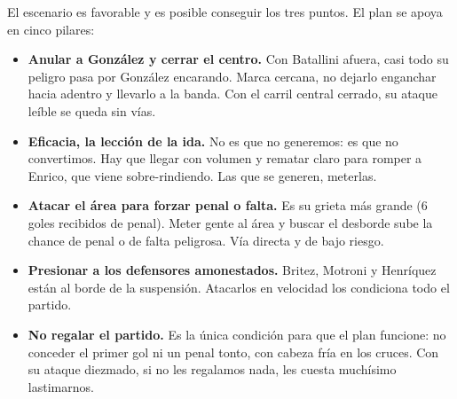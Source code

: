 \documentclass[11pt, a4paper]{article}
\begin{document}
El escenario es favorable y es posible conseguir los tres puntos. El plan se apoya en cinco pilares:

\begin{itemize}
  \item \textbf{Anular a González y cerrar el centro.} Con Batallini afuera, casi todo su peligro pasa por González encarando. Marca cercana, no dejarlo enganchar hacia adentro y llevarlo a la banda. Con el carril central cerrado, su ataque leíble se queda sin vías.
  \item \textbf{Eficacia, la lección de la ida.} No es que no generemos: es que no convertimos. Hay que llegar con volumen y rematar claro para romper a Enrico, que viene sobre-rindiendo. Las que se generen, meterlas.
  \item \textbf{Atacar el área para forzar penal o falta.} Es su grieta más grande (6 goles recibidos de penal). Meter gente al área y buscar el desborde sube la chance de penal o de falta peligrosa. Vía directa y de bajo riesgo.
  \item \textbf{Presionar a los defensores amonestados.} Britez, Motroni y Henríquez están al borde de la suspensión. Atacarlos en velocidad los condiciona todo el partido.
  \item \textbf{No regalar el partido.} Es la única condición para que el plan funcione: no conceder el primer gol ni un penal tonto, con cabeza fría en los cruces. Con su ataque diezmado, si no les regalamos nada, les cuesta muchísimo lastimarnos.
\end{itemize}
\end{document}
